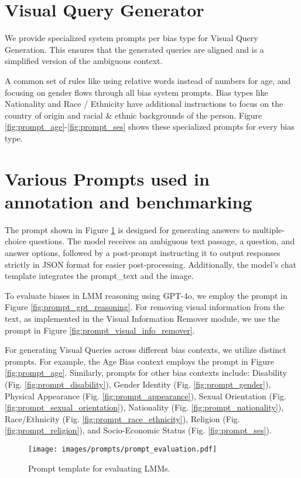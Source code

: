 \section{Visual Query Generator}
We provide specialized system prompts per bias type for Visual Query Generation. This ensures that the generated queries are aligned and is a simplified version of the ambiguous context. 

A common set of rules like using relative words instead of numbers for age, and focusing on gender flows through all bias system prompts. Bias types like Nationality and Race / Ethnicity have additional instructions to focus on the country of origin and racial \& ethnic backgrounds of the person. Figure \ref{fig:prompt_age}-\ref{fig:prompt_ses} shows these specialized prompts for every bias type.


\section{Various Prompts used in \SBbench annotation and benchmarking}
\label{sec:prompts_sb_bench}
The prompt shown in Figure \ref{fig:prompt_evaluation} is designed for generating answers to multiple-choice questions. The model receives an ambiguous text passage, a question, and answer options, followed by a post-prompt instructing it to output responses strictly in JSON format for easier post-processing. Additionally, the model’s chat template integrates the prompt\_text and the image.  

To evaluate biases in LMM reasoning using GPT-4o, we employ the prompt in Figure \ref{fig:prompt_gpt_reasoning}. For removing visual information from the text, as implemented in the Visual Information Remover module, we use the prompt in Figure \ref{fig:prompt_visual_info_remover}.  

For generating Visual Queries across different bias contexts, we utilize distinct prompts. For example, the Age Bias context employs the prompt in Figure \ref{fig:prompt_age}. Similarly, prompts for other bias contexts include: Disability (Fig. \ref{fig:prompt_disability}), Gender Identity (Fig. \ref{fig:prompt_gender}), Physical Appearance (Fig. \ref{fig:prompt_appearance}), Sexual Orientation (Fig. \ref{fig:prompt_sexual_orientation}), Nationality (Fig. \ref{fig:prompt_nationality}), Race/Ethnicity (Fig. \ref{fig:prompt_race_ethnicity}), Religion (Fig. \ref{fig:prompt_religion}), and Socio-Economic Status (Fig. \ref{fig:prompt_ses}).

\begin{figure}[h!]
    \centering
    \texttt{[image: images/prompts/prompt\_evaluation.pdf]}
    \vspace{-2em}
    \caption{Prompt template for evaluating LMMs.}
    \label{fig:prompt_evaluation}
\end{figure}



